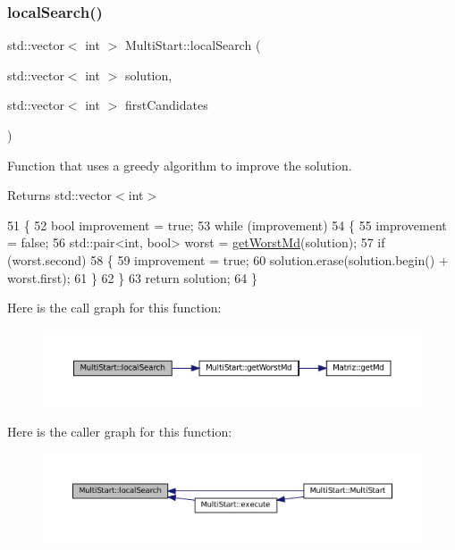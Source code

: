 \subsubsection{\texorpdfstring{local\+Search()}{localSearch()}}
{\footnotesize\ttfamily std\+::vector$<$ int $>$ Multi\+Start\+::local\+Search (\begin{DoxyParamCaption}\item[{std\+::vector$<$ int $>$}]{solution,  }\item[{std\+::vector$<$ int $>$}]{first\+Candidates }\end{DoxyParamCaption})}



Function that uses a greedy algorithm to improve the solution. 

\begin{DoxyReturn}{Returns}
std\+::vector$<$int$>$ 
\end{DoxyReturn}

\begin{DoxyCode}
51 \{
52   \textcolor{keywordtype}{bool} improvement = \textcolor{keyword}{true};
53   \textcolor{keywordflow}{while} (improvement)
54   \{
55     improvement = \textcolor{keyword}{false};
56     std::pair<int, bool> worst = \hyperlink{classMultiStart_a0ad5ed40a5c4ab964cb27f79343eed98}{getWorstMd}(solution);
57     \textcolor{keywordflow}{if} (worst.second)
58     \{
59       improvement = \textcolor{keyword}{true};
60       solution.erase(solution.begin() + worst.first);
61     \}
62   \}
63   \textcolor{keywordflow}{return} solution;
64 \}
\end{DoxyCode}
Here is the call graph for this function\+:\nopagebreak
\begin{figure}[H]
\begin{center}
\leavevmode
\includegraphics[width=350pt]{classMultiStart_af27ae5dbba5f924070f103b7bf5987a3_cgraph}
\end{center}
\end{figure}
Here is the caller graph for this function\+:\nopagebreak
\begin{figure}[H]
\begin{center}
\leavevmode
\includegraphics[width=350pt]{classMultiStart_af27ae5dbba5f924070f103b7bf5987a3_icgraph}
\end{center}
\end{figure}
\mbox{\label{classMultiStart_a456dc441b6e7028aa86a0488830f9bc1}} 
